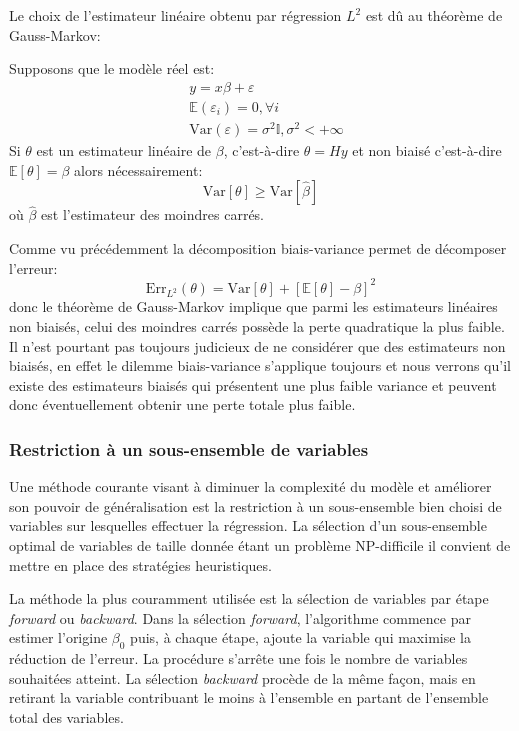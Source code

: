 Le choix de l'estimateur linéaire obtenu par régression $L^2$ est dû au théorème de Gauss-Markov:
\begin{definition}
    Supposons que le modèle réel est:
    \begin{align*}
        &y = x \beta + \varepsilon \\
        &\mathbb{E} ( \varepsilon_i ) = 0 , \forall i \\
        &\mathrm{Var} ( \varepsilon ) = \sigma^2 \mathbb{I} , \sigma^2 < + \infty 
    \end{align*}
    Si $\theta$  est un estimateur linéaire de $\beta$, c'est-à-dire $\theta = H y$ et non biaisé c'est-à-dire $\mathbb{E} [\theta] = \beta$ alors nécessairement:
    \begin{equation*}
        \mathrm{Var} [\theta] \geq \mathrm{Var} [\hat{\beta}]
    \end{equation*}
    où $\hat{\beta}$ est l'estimateur des moindres carrés.
\end{definition}

Comme vu précédemment la décomposition biais-variance permet de décomposer l'erreur:
\begin{equation*}
    \mathrm{Err}_{L^2} ( \theta ) = \mathrm{Var} [\theta] + \left[ \mathbb{E} [\theta] - \beta \right]^2
\end{equation*}
donc le théorème de Gauss-Markov implique que parmi les estimateurs linéaires non biaisés, celui des moindres carrés possède la perte quadratique la plus faible. Il n'est pourtant pas toujours judicieux de ne considérer que des estimateurs non biaisés, en effet le dilemme biais-variance s'applique toujours et nous verrons qu'il existe des estimateurs biaisés qui présentent une plus faible variance et peuvent donc éventuellement obtenir une perte totale plus faible.

\subsubsection{Restriction à un sous-ensemble de variables}

Une méthode courante visant à diminuer la complexité du modèle et améliorer son pouvoir de généralisation est la restriction à un sous-ensemble bien choisi de variables sur lesquelles effectuer la régression. La sélection d'un sous-ensemble optimal de variables de taille donnée étant un problème NP-difficile il convient de mettre en place des stratégies heuristiques.

La méthode la plus couramment utilisée est la sélection de variables par étape \emph{forward} ou \emph{backward}. Dans la sélection \emph{forward}, l'algorithme commence par estimer l'origine $\beta_0$ puis, à chaque étape, ajoute la variable qui maximise la réduction de l'erreur. La procédure s'arrête une fois le nombre de variables souhaitées atteint. La sélection \emph{backward} procède de la même façon, mais en retirant la variable contribuant le moins à l'ensemble en partant de l'ensemble total des variables.


